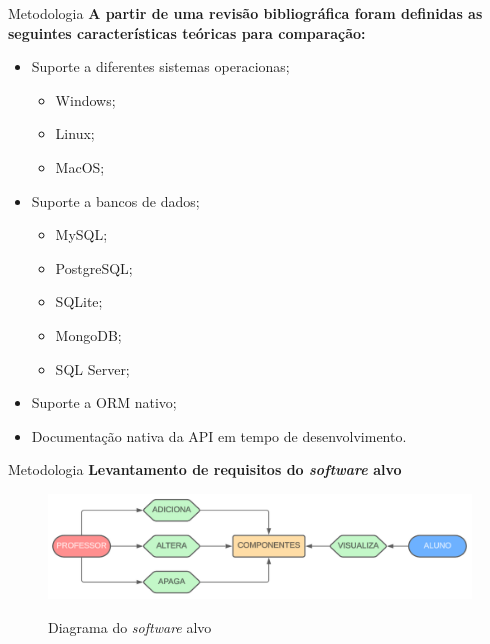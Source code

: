 \documentclass{libs/ufc_format}
\begin{document}
\begin{frame}{Metodologia}
    \textbf{A partir de uma revisão bibliográfica foram definidas as seguintes características teóricas para comparação:}
    \begin{itemize}
        \item Suporte a diferentes sistemas operacionas;
            \begin{itemize}
                \item Windows;
                \item Linux;
                \item MacOS;
            \end{itemize}
        \item Suporte a bancos de dados;
            \begin{itemize}
                \item MySQL;
                \item PostgreSQL;
                \item SQLite;
                \item MongoDB;
                \item SQL Server;
            \end{itemize}
        \item Suporte a ORM nativo;
        \item Documentação nativa da API em tempo de desenvolvimento.
    \end{itemize} 
\end{frame}

\begin{frame}{Metodologia}
    \textbf{Levantamento de requisitos do \textit{software} alvo}
    \begin{figure}[H]
        \centering
        \caption{Diagrama do \textit{software} alvo}
        \includegraphics[width=1\linewidth]{figuras/diagama-soft-alvo.png}
        \captionsetup{justification=centering}
        \label{fig:diagrama-soft-alvo}
    \end{figure}
\end{frame}
\end{document}
